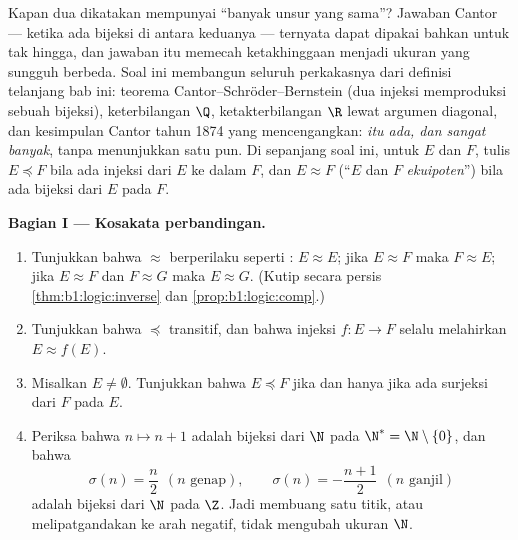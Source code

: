 \begin{problem}\label{pb:b1:logic:1}
Kapan dua  dikatakan mempunyai ``banyak unsur yang sama''?
Jawaban Cantor --- ketika ada bijeksi di antara keduanya --- ternyata
dapat dipakai bahkan untuk  tak hingga, dan jawaban itu
memecah ketakhinggaan menjadi ukuran yang sungguh berbeda. Soal ini
membangun seluruh perkakasnya dari definisi telanjang bab ini: teorema
Cantor--Schröder--Bernstein (dua injeksi memproduksi sebuah bijeksi),
keterbilangan $\Q$, ketakterbilangan $\R$ lewat argumen diagonal, dan
kesimpulan Cantor tahun 1874 yang mencengangkan: \emph{ itu ada, dan sangat banyak}, tanpa menunjukkan satu pun.
Di sepanjang soal ini, untuk  $E$ dan $F$, tulis $E \preceq F$
bila ada injeksi dari $E$ ke dalam $F$, dan $E \approx F$ (``$E$ dan
$F$ \emph{ekuipoten}'') bila ada bijeksi dari $E$
pada $F$.

\medskip
\noindent\textbf{Bagian I --- Kosakata perbandingan.}
\begin{enumerate}
  \item Tunjukkan bahwa $\approx$ berperilaku seperti : $E \approx E$; jika $E \approx F$ maka
        $F \approx E$; jika $E \approx F$ dan $F \approx G$ maka
        $E \approx G$. (Kutip secara persis
        \cref{thm:b1:logic:inverse} dan
        \cref{prop:b1:logic:comp}.)
  \item Tunjukkan bahwa $\preceq$ transitif, dan bahwa injeksi
        $f \colon E \to F$ selalu melahirkan $E \approx f(E)$.
  \item Misalkan $E \neq \emptyset$. Tunjukkan bahwa $E \preceq F$
        jika dan hanya jika ada surjeksi dari $F$ pada $E$.
  \item Periksa bahwa $n \mapsto n + 1$ adalah bijeksi dari $\N$ pada
        $\N^* = \N \setminus \{0\}$, dan bahwa
        \[
        \sigma(n) = \frac n2 \ \ (n \text{ genap}), \qquad
        \sigma(n) = -\frac{n+1}2 \ \ (n \text{ ganjil})
        \]
        adalah bijeksi dari $\N$ pada $\Z$. Jadi membuang satu titik,
        atau melipatgandakan ke arah negatif, tidak mengubah ukuran
        $\N$.
\end{enumerate}


\end{problem}
